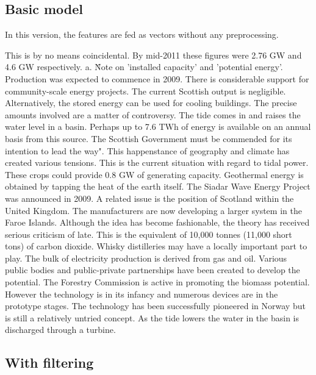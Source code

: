 \subsection{Basic model}

In this version, the features are fed as vectors without any preprocessing.

\begin{tcolorbox}\footnotesize
	This is by no means coincidental.
	By mid-2011 these figures were 2.76 GW and 4.6 GW respectively.
	a. \^ Note on 'installed capacity' and 'potential energy'.
	Production was expected to commence in 2009.
	There is considerable support for community-scale energy projects.
	The current Scottish output is negligible.
	Alternatively, the stored energy can be used for cooling buildings.
	The precise amounts involved are a matter of controversy.
	The tide comes in and raises the water level in a basin.
	Perhaps up to 7.6 TWh of energy is available on an annual basis from this source.
	The Scottish Government must be commended for its intention to lead the way".
	This happenstance of geography and climate has created various tensions.
	This is the current situation with regard to tidal power.
	These crops could provide 0.8 GW of generating capacity.
	Geothermal energy is obtained by tapping the heat of the earth itself.
	The Siadar Wave Energy Project was announced in 2009.
	A related issue is the position of Scotland within the United Kingdom.
	The manufacturers are now developing a larger system in the Faroe Islands.
	Although the idea has become fashionable, the theory has received serious criticism of late.
	This is the equivalent of 10,000 tonnes (11,000 short tons) of carbon dioxide.
	Whisky distilleries may have a locally important part to play.
	The bulk of electricity production is derived from gas and oil.
	Various public bodies and public-private partnerships have been created to develop the potential.
	The Forestry Commission is active in promoting the biomass potential.
	However the technology is in its infancy and numerous devices are in the prototype stages.
	The technology has been successfully pioneered in Norway but is still a relatively untried concept.
	As the tide lowers the water in the basin is discharged through a turbine.
\end{tcolorbox}	

\subsection{With filtering}

